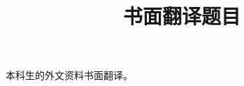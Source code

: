 
\begin{translation}
\label{cha:translation}

\title{书面翻译题目}
\maketitle

\tableofcontents

本科生的外文资料书面翻译。


\end{translation}
